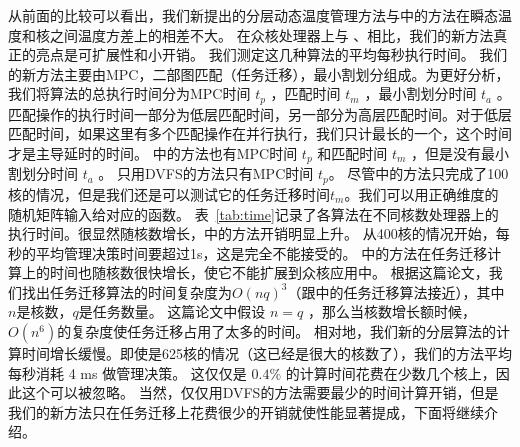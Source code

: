  从前面的比较可以看出，我们新提出的分层动态温度管理方法与\cite{MaWang:APCCAS'14}中的方法在瞬态温度和核之间温度方差上的相差不大。
 在众核处理器上与 \cite{MaWang:APCCAS'14}、\cite{Hanumaiah:TCAD'11}相比，我们的新方法真正的亮点是可扩展性和小开销。
 我们测定这几种算法的平均每秒执行时间。
 我们的新方法主要由MPC，二部图匹配（任务迁移），最小割划分组成。为更好分析，我们将算法的总执行时间分为MPC时间 $t_p$ ，匹配时间 $t_m$ ，最小割划分时间 $t_a$ 。
 匹配操作的执行时间一部分为低层匹配时间，另一部分为高层匹配时间。对于低层匹配时间，如果这里有多个匹配操作在并行执行，我们只计最长的一个，这个时间才是主导延时的时间。
 \cite{MaWang:APCCAS'14}中的方法也有MPC时间 $t_p$ 和匹配时间 $t_m$ ，但是没有最小割划分时间 $t_a$ 。
 只用DVFS的方法只有MPC时间 $t_p$。
 尽管\cite{Hanumaiah:TCAD'11}中的方法只完成了100核的情况，但是我们还是可以测试它的任务迁移时间$t_m$。我们可以用正确维度的随机矩阵输入给对应的函数。
 表~\ref{tab:time}记录了各算法在不同核数处理器上的执行时间。很显然随核数增长，\cite{MaWang:APCCAS'14}中的方法开销明显上升。
 从400核的情况开始，每秒的平均管理决策时间要超过1s，这是完全不能接受的。
 \cite{Hanumaiah:TCAD'11}中的方法在任务迁移计算上的时间也随核数很快增长，使它不能扩展到众核应用中。
 根据这篇论文，我们找出任务迁移算法的时间复杂度为$O(nq)^3$（跟\cite{MaWang:APCCAS'14}中的任务迁移算法接近），其中$n$是核数，$q$是任务数量。
 这篇论文中假设 $n=q$ ，那么当核数增长额时候，$O(n^6)$的复杂度使任务迁移占用了太多的时间。
 相对地，我们新的分层算法的计算时间增长缓慢。即使是625核的情况（这已经是很大的核数了），我们的方法平均每秒消耗 4 ms 做管理决策。
 这仅仅是 $0.4\%$ 的计算时间花费在少数几个核上，因此这个可以被忽略。
 当然，仅仅用DVFS的方法需要最少的时间计算开销，但是我们的新方法只在任务迁移上花费很少的开销就使性能显著提成，下面将继续介绍。
 

